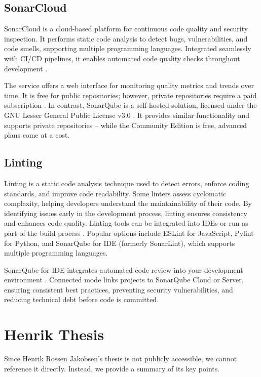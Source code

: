 \subsection{SonarCloud}
SonarCloud is a cloud-based platform for continuous code quality and security inspection. It performs static code analysis to detect bugs, vulnerabilities, and code smells, supporting multiple programming languages. Integrated seamlessly with CI/CD pipelines, it enables automated code quality checks throughout development \Parencite{SonarQubeDocs2025}.

The service offers a web interface for monitoring quality metrics and trends over time. It is free for public repositories; however, private repositories require a paid subscription \Parencite{SonarCloudPricing2025}. In contrast, SonarQube is a self-hosted solution, licensed under the GNU Lesser General Public License v3.0 \Parencite{SonarQubeLicense2025}. It provides similar functionality and supports private repositories -- while the Community Edition is free, advanced plans come at a cost.

\subsection{Linting}
Linting is a static code analysis technique used to detect errors, enforce coding standards, and improve code readability. Some linters assess cyclomatic complexity, helping developers understand the maintainability of their code. By identifying issues early in the development process, linting ensures consistency and enhances code quality. Linting tools can be integrated into IDEs or run as part of the build process \Parencite{SuperLinter2025}. Popular options include ESLint for JavaScript, Pylint for Python, and SonarQube for IDE (formerly SonarLint), which supports multiple programming languages.

SonarQube for IDE integrates automated code review into your development environment \Parencite{SonarQubeConnectedMode2025}. Connected mode links projects to SonarQube Cloud or Server, ensuring consistent best practices, preventing security vulnerabilities, and reducing technical debt before code is committed.

\section{Henrik Thesis}\label{sec:henrik_thesis}
Since Henrik Rossen Jakobsen's thesis is not publicly accessible, we cannot reference it directly. Instead, we provide a summary of its key points.

